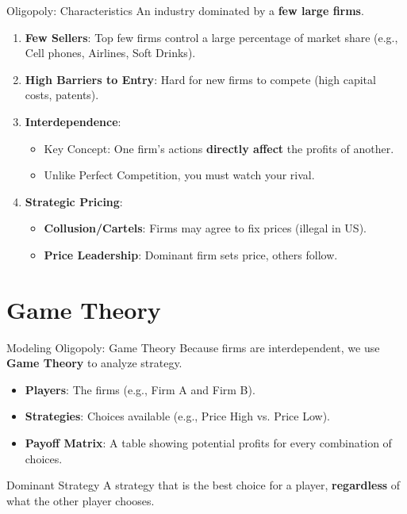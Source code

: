 \documentclass[aspectratio=169]{beamer}
\begin{document}
\begin{frame}{Oligopoly: Characteristics}
    An industry dominated by a \textbf{few large firms}.
    \vspace{0.3cm}
    \begin{enumerate}
        \item \textbf{Few Sellers}: Top few firms control a large percentage of market share (e.g., Cell phones, Airlines, Soft Drinks).
        \item \textbf{High Barriers to Entry}: Hard for new firms to compete (high capital costs, patents).
        \item \textbf{Interdependence}:
        \begin{itemize}
            \item \alert{Key Concept}: One firm's actions \textbf{directly affect} the profits of another.
            \item Unlike Perfect Competition, you must watch your rival.
        \end{itemize}
        \item \textbf{Strategic Pricing}:
        \begin{itemize}
            \item \textbf{Collusion/Cartels}: Firms may agree to fix prices (illegal in US).
            \item \textbf{Price Leadership}: Dominant firm sets price, others follow.
        \end{itemize}
    \end{enumerate}
\end{frame}

\section{Game Theory}

\begin{frame}{Modeling Oligopoly: Game Theory}
    Because firms are interdependent, we use \textbf{Game Theory} to analyze strategy.
    
    \begin{itemize}
        \item \textbf{Players}: The firms (e.g., Firm A and Firm B).
        \item \textbf{Strategies}: Choices available (e.g., Price High vs. Price Low).
        \item \textbf{Payoff Matrix}: A table showing potential profits for every combination of choices.
    \end{itemize}
    
    \begin{block}{Dominant Strategy}
        A strategy that is the best choice for a player, \textbf{regardless} of what the other player chooses.
    \end{block}
\end{frame}
\end{document}

